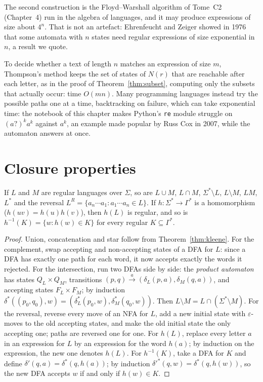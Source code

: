 The second construction is the Floyd--Warshall algorithm of Tome~C2 (Chapter~4) run in the algebra of languages, and it may produce expressions of size about $4^n$. That is not an artefact: Ehrenfeucht and Zeiger showed in 1976 that some automata with $n$ states need regular expressions of size exponential in $n$, a result we quote.

\begin{remark}
To decide whether a text of length $n$ matches an expression of size $m$, Thompson's method keeps the set of states of $N(r)$ that are reachable after each letter, as in the proof of Theorem~\ref{thm:subset}, computing only the subsets that actually occur: time $O(mn)$. Many programming languages instead try the possible paths one at a time, backtracking on failure, which can take exponential time: the notebook of this chapter makes Python's \texttt{re} module struggle on $(a?)^ka^k$ against $a^k$, an example made popular by Russ Cox in 2007, while the automaton answers at once.
\end{remark}

\section{Closure properties}\label{sec:closure}

\begin{proposition}\label{prop:closure}
If $L$ and $M$ are regular languages over $\Sigma$, so are $L\cup M$, $L\cap M$, $\Sigma^*\setminus L$, $L\setminus M$, $LM$, $L^*$ and the reversal $L^R=\{a_n\cdots a_1:a_1\cdots a_n\in L\}$. If $h:\Sigma^*\to\Gamma^*$ is a homomorphism ($h(uv)=h(u)h(v)$), then $h(L)$ is regular, and so is $h^{-1}(K)=\{w:h(w)\in K\}$ for every regular $K\subseteq\Gamma^*$.
\end{proposition}

\begin{proof}
Union, concatenation and star follow from Theorem~\ref{thm:kleene}. For the complement, swap accepting and non-accepting states of a DFA for $L$: since a DFA has exactly one path for each word, it now accepts exactly the words it rejected. For the intersection, run two DFAs side by side: the \emph{product automaton} has states $Q_L\times Q_M$, transitions $(p,q)\xrightarrow{a}(\delta_L(p,a),\delta_M(q,a))$, and accepting states $F_L\times F_M$; by induction $\delta^*((p_0,q_0),w)=(\delta_L^*(p_0,w),\delta_M^*(q_0,w))$. Then $L\setminus M=L\cap(\Sigma^*\setminus M)$. For the reversal, reverse every move of an NFA for $L$, add a new initial state with $\varepsilon$-moves to the old accepting states, and make the old initial state the only accepting one; paths are reversed one for one. For $h(L)$, replace every letter $a$ in an expression for $L$ by an expression for the word $h(a)$; by induction on the expression, the new one denotes $h(L)$. For $h^{-1}(K)$, take a DFA for $K$ and define $\delta'(q,a)=\delta^*(q,h(a))$; by induction $\delta'^*(q,w)=\delta^*(q,h(w))$, so the new DFA accepts $w$ if and only if $h(w)\in K$.
\end{proof}

